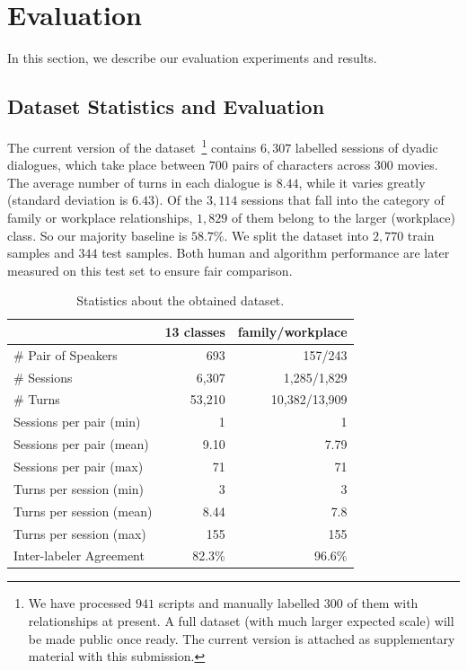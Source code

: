 \section {Evaluation}
\label{sec:eval}
In this section, we describe our evaluation experiments and results.

\subsection{Dataset Statistics and Evaluation}
\label{subsec:human baseline}

The current version of the dataset~\footnote{We have processed $941$ scripts and 
	manually labelled $300$ of them with relationships at present.
 A full dataset (with much larger expected scale) will be made 
public once ready. The current version is attached as supplementary material with this submission.}
contains $6,307$ labelled sessions of dyadic dialogues, 
which take place between $700$ pairs of characters across $300$ movies. 
The average number of turns in each dialogue is $8.44$, 
while it varies greatly (standard deviation is $6.43$). 
Of the $3,114$ sessions that fall into the category of family or 
workplace relationships, $1,829$ of them belong to the larger (workplace) class. 
So our majority baseline is $58.7\%$. We split the dataset into $2,770$ train samples and $344$ test samples. Both human and algorithm performance are later measured on this test set to ensure fair comparison. 
\begin{table}[h!]
	\centering
	\small
	\begin{tabular}{@{}lrr@{}}
		\toprule
		\textbf{}                & 13 classes & family/workplace \\ \midrule
		\# Pair of Speakers      & 693        & 157/243             \\
		\# Sessions              & 6,307       & 1,285/1,829        \\
		\# Turns                 & 53,210     & 10,382/13,909           \\
		Sessions per pair (min)  & 1          & 1                \\
		Sessions per pair (mean) & 9.10       & 7.79             \\
		Sessions per pair (max)  & 71         & 71               \\
		Turns per session (min)  & 3          & 3                \\
		Turns per session (mean) & 8.44       & 7.8              \\
		Turns per session (max)  & 155        & 155              \\\midrule
		Inter-labeler Agreement & 82.3\%     & 96.6\%           \\ \bottomrule
	\end{tabular}
	\caption{Statistics about the obtained dataset.}\label{table:dataset}
\end{table}

